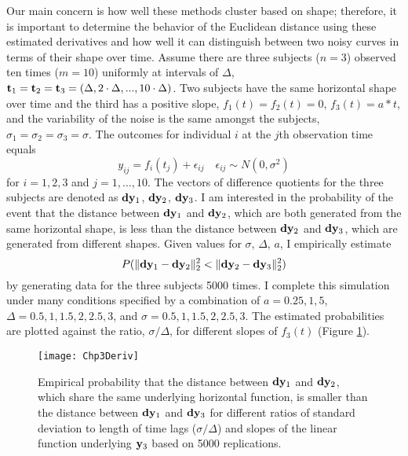 Our main concern is how well these methods cluster based on shape; therefore, it is important to determine the behavior of the Euclidean distance using these estimated derivatives and how well it can distinguish between two noisy curves in terms of their shape over time. Assume there are three subjects ($n=3$) observed ten times ($m=10$) uniformly at intervals of $\Delta$, $\mathbf t_1 = \mathbf t_2=\mathbf t_3 = (\Delta,2\cdot\Delta,...,10\cdot\Delta)$. Two subjects have the same horizontal shape over time and the third has a positive slope, $f_1(t) = f_2(t) =0$, $f_3(t)=a*t$, and the variability of the noise is the same amongst the subjects, $\sigma_1=\sigma_2=\sigma_3=\sigma$. The outcomes for individual $i$ at the $j$th observation time equals
$$y_{ij}=f_{i}(t_{j})+\epsilon_{ij}\quad \epsilon_{ij}\sim N(0,\sigma^{2})$$
for $i=1,2,3$ and $j=1,...,10$. The vectors of difference quotients for the three subjects are denoted as $\mathbf d\mathbf y_1$, $\mathbf d\mathbf y_2$, $\mathbf d\mathbf y_3$. I am interested in the probability of the event that the distance between $\mathbf d\mathbf y_1$ and $\mathbf d\mathbf y_2$, which are both generated from the same horizontal shape, is less than the distance between $\mathbf d\mathbf y_2$ and $\mathbf d\mathbf y_3$, which are generated from different shapes. Given values for $\sigma$, $\Delta$, $a$, I empirically estimate
$$P(\|\mathbf d\mathbf y_1-\mathbf d\mathbf y_2\|^2_2 < \|\mathbf d\mathbf y_2-\mathbf d\mathbf y_3\|^{2}_{2})$$
by generating data for the three subjects 5000 times. I complete this simulation under many conditions specified by a combination of $a = 0.25, 1, 5$, $\Delta = 0.5,1,1.5,2,2.5,3$, and $\sigma = 0.5,1,1.5,2,2.5,3$. The estimated probabilities are plotted against the ratio, $\sigma/\Delta$, for different slopes of $f_{3}(t)$ (Figure \ref{fig:3-3}). 

\begin{figure}
\begin{center}
\texttt{[image: Chp3Deriv]}
\end{center}
\caption{Empirical probability that the distance between $\mathbf d\mathbf y_{1}$ and $\mathbf d\mathbf y_{2}$, which share the same underlying horizontal function, is smaller than the distance between $\mathbf d\mathbf y_{1}$ and $\mathbf d\mathbf y_{3}$ for different ratios of standard deviation to length of time lags ($\sigma/\Delta$) and slopes of the linear function underlying $\mathbf y_{3}$ based on 5000 replications.}
\label{fig:3-3} 
\end{figure}

